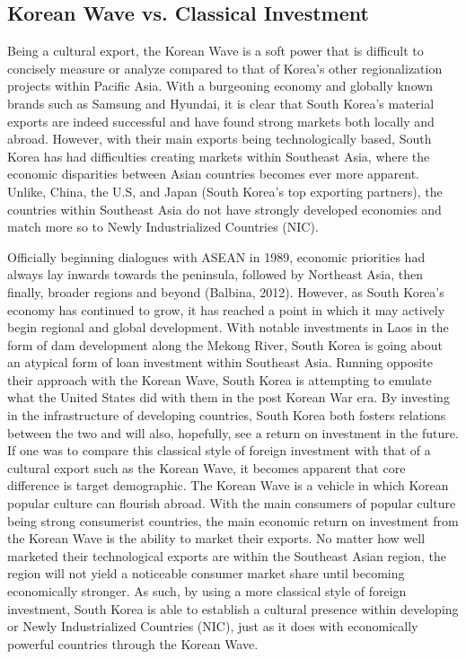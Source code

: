 \documentclass[man,donotrepeattitle,letter]{apa6}
\begin{document}
\subsection{Korean Wave vs. Classical Investment}
Being a cultural export, the Korean Wave is a soft power that is difficult to concisely measure or analyze compared to that of Korea's other regionalization projects within Pacific Asia.  With a burgeoning economy and globally known brands such as Samsung and Hyundai, it is clear that South Korea's material exports are indeed successful and have found strong markets both locally and abroad. However, with their main exports being technologically based, South Korea has had difficulties creating markets within Southeast Asia, where the economic disparities between Asian countries becomes ever more apparent. Unlike, China, the U.S, and Japan (South Korea's top exporting partners), the countries within Southeast Asia do not have strongly developed economies and match more so to Newly Industrialized Countries (NIC).

Officially beginning dialogues with ASEAN in 1989, economic priorities had always lay inwards towards the peninsula, followed by Northeast Asia, then finally, broader regions and beyond (Balbina, 2012).  However, as South Korea's economy has continued to grow, it has reached a point in which it may actively begin regional and global development.  With notable investments in Laos in the form of dam development along the Mekong River, South Korea is going about an atypical form of loan investment within Southeast Asia. Running opposite their approach with the Korean Wave, South Korea is attempting to emulate what the United States did with them in the post Korean War era.  By investing in the infrastructure of developing countries, South Korea both fosters relations between the two and will also, hopefully, see a return on investment in the future.  If one was to compare this classical style of foreign investment with that of a cultural export such as the Korean Wave, it becomes apparent that core difference is target demographic.  The Korean Wave is a vehicle in which Korean popular culture can flourish abroad. With the main consumers of popular culture being strong consumerist countries, the main economic return on investment from the Korean Wave is the ability to market their exports.  No matter how well marketed their technological exports are within the Southeast Asian region, the region will not yield a noticeable consumer market share until becoming economically stronger.  As such, by using a more classical style of foreign investment, South Korea is able to establish a cultural presence within developing or Newly Industrialized Countries (NIC), just as it does with economically powerful countries through the Korean Wave.
\end{document}
